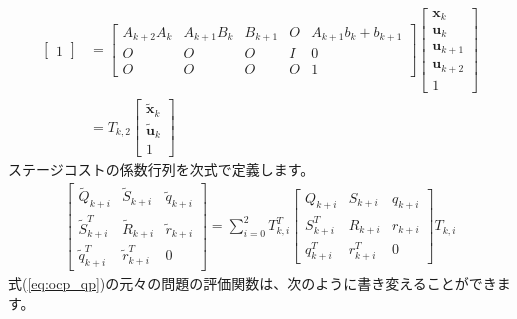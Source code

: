 \documentclass[a4paper]{jarticle}
\begin{document}
\begin{align*}
\begin{bmatrix}
  1
  \end{bmatrix}
  &=
  \begin{bmatrix}
  A_{k+2}A_k & A_{k+1}B_{k} & B_{k+1} & O & A_{k+1}b_k + b_{k+1}\\
  O & O & O & I & 0 \\
  O & O & O & O & 1 
  \end{bmatrix}    
  \begin{bmatrix}
  \mathbf{x}_{k}\\
  \mathbf{u}_{k}\\
  \mathbf{u}_{k+1}\\
  \mathbf{u}_{k+2}\\
  1
  \end{bmatrix}  
  \\
  &=
  T_{k,2}
  \begin{bmatrix}
  \tilde{\mathbf{x}}_{k}\\
  \tilde{\mathbf{u}}_{k}\\
  1
  \end{bmatrix}
\end{align*}
ステージコストの係数行列を次式で定義します。
\begin{align*}
 \begin{bmatrix} \tilde{Q}_{k+i} & \tilde{S}_{k+i} & \tilde{q}_{k+i} \\ \tilde{S}_{k+i}^T & \tilde{R}_{k+i} & \tilde{r}_{k+i} \\ \tilde{q}_{k+i}^T & \tilde{r}_{k+i}^T & 0\end{bmatrix}
 = 
\sum_{i=0}^{2}
 T_{k,i}^T
 \begin{bmatrix} Q_{k+i} & S_{k+i} & q_{k+i} \\ S_{k+i}^T & R_{k+i} & r_{k+i} \\ q_{k+i}^T & r_{k+i}^T & 0\end{bmatrix}
 T_{k,i}
\end{align*}
式(\ref{eq:ocp_qp})の元々の問題の評価関数は、次のように書き変えることができます。
\end{document}
